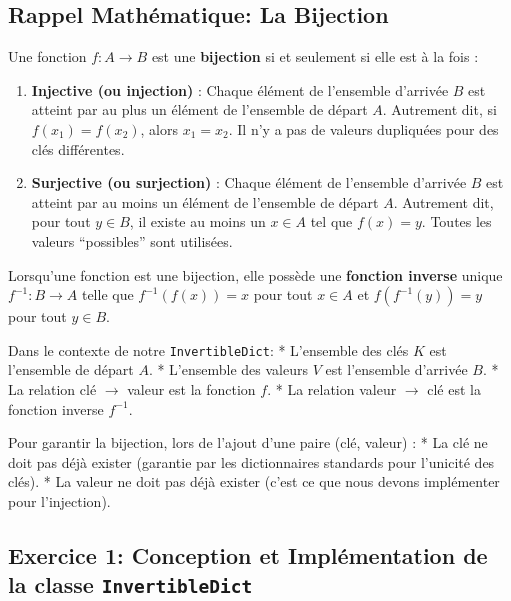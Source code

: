 \documentclass[12pt,a4paper]{report}
\newcommand{\passthrough}[1]{#1}
\providecommand{\tightlist}{%
  \setlength{\itemsep}{0pt}\setlength{\parskip}{0pt}}
\begin{document}
\subsection{Rappel Mathématique: La
Bijection}\label{rappel-mathuxe9matique-la-bijection}

Une fonction \(f: A \to B\) est une \textbf{bijection} si et seulement
si elle est à la fois :

\begin{enumerate}
\def\labelenumi{\arabic{enumi}.}
\tightlist
\item
  \textbf{Injective (ou injection)} : Chaque élément de l'ensemble
  d'arrivée \(B\) est atteint par au plus un élément de l'ensemble de
  départ \(A\). Autrement dit, si \(f(x_1) = f(x_2)\), alors
  \(x_1 = x_2\). Il n'y a pas de valeurs dupliquées pour des clés
  différentes.
\item
  \textbf{Surjective (ou surjection)} : Chaque élément de l'ensemble
  d'arrivée \(B\) est atteint par au moins un élément de l'ensemble de
  départ \(A\). Autrement dit, pour tout \(y \in B\), il existe au moins
  un \(x \in A\) tel que \(f(x) = y\). Toutes les valeurs ``possibles''
  sont utilisées.
\end{enumerate}

Lorsqu'une fonction est une bijection, elle possède une \textbf{fonction
inverse} unique \(f^{-1}: B \to A\) telle que \(f^{-1}(f(x)) = x\) pour
tout \(x \in A\) et \(f(f^{-1}(y)) = y\) pour tout \(y \in B\).

Dans le contexte de notre \passthrough{\lstinline!InvertibleDict!}: *
L'ensemble des clés \(K\) est l'ensemble de départ \(A\). * L'ensemble
des valeurs \(V\) est l'ensemble d'arrivée \(B\). * La relation clé
\(\to\) valeur est la fonction \(f\). * La relation valeur \(\to\) clé
est la fonction inverse \(f^{-1}\).

Pour garantir la bijection, lors de l'ajout d'une paire (clé, valeur) :
* La clé ne doit pas déjà exister (garantie par les dictionnaires
standards pour l'unicité des clés). * La valeur ne doit pas déjà exister
(c'est ce que nous devons implémenter pour l'injection).

\subsection{\texorpdfstring{Exercice 1: Conception et Implémentation de
la classe
\texttt{InvertibleDict}}{Exercice 1: Conception et Implémentation de la classe InvertibleDict}}\label{exercice-1-conception-et-impluxe9mentation-de-la-classe-invertibledict}
\end{document}
